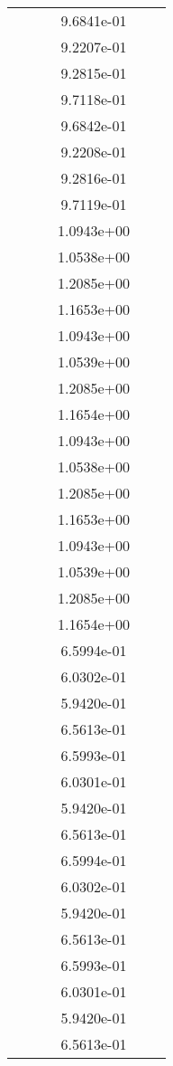 \begin{xltabular}{\textwidth}{r|rS[table-format=1.3e+2]S[table-format=1.4e+2]S[table-format=1.4e+2]S[table-format=-1.5]}
&  &  & 9.6841e-01 & & \\
&  &  & 9.2207e-01 & & \\
&  &  & 9.2815e-01 & & \\
&  &  & 9.7118e-01 & & \\
&  &  & 9.6842e-01 & & \\
&  &  & 9.2208e-01 & & \\
&  &  & 9.2816e-01 & & \\
&  &  & 9.7119e-01 & & \\
&  &  & 1.0943e+00 & & \\
&  &  & 1.0538e+00 & & \\
&  &  & 1.2085e+00 & & \\
&  &  & 1.1653e+00 & & \\
&  &  & 1.0943e+00 & & \\
&  &  & 1.0539e+00 & & \\
&  &  & 1.2085e+00 & & \\
&  &  & 1.1654e+00 & & \\
&  &  & 1.0943e+00 & & \\
&  &  & 1.0538e+00 & & \\
&  &  & 1.2085e+00 & & \\
&  &  & 1.1653e+00 & & \\
&  &  & 1.0943e+00 & & \\
&  &  & 1.0539e+00 & & \\
&  &  & 1.2085e+00 & & \\
&  &  & 1.1654e+00 & & \\
&  &  & 6.5994e-01 & & \\
&  &  & 6.0302e-01 & & \\
&  &  & 5.9420e-01 & & \\
&  &  & 6.5613e-01 & & \\
&  &  & 6.5993e-01 & & \\
&  &  & 6.0301e-01 & & \\
&  &  & 5.9420e-01 & & \\
&  &  & 6.5613e-01 & & \\
&  &  & 6.5994e-01 & & \\
&  &  & 6.0302e-01 & & \\
&  &  & 5.9420e-01 & & \\
&  &  & 6.5613e-01 & & \\
&  &  & 6.5993e-01 & & \\
&  &  & 6.0301e-01 & & \\
&  &  & 5.9420e-01 & & \\
&  &  & 6.5613e-01 & & \\

\end{xltabular}
